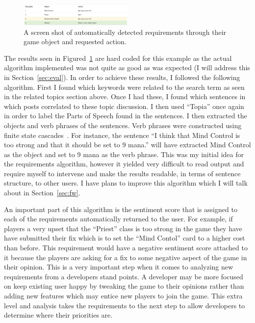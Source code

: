 \documentclass[conference]{IEEEtran}
\begin{document}
\begin{figure}[h]
\centering
\includegraphics[width=0.5\textwidth]{images/req.png}
\caption{A screen shot of automatically detected requirements through their game object and
requested action.\label{fig:req}}
\end{figure}

The results seen in Figured~\ref{fig:req} are hard coded for this example as the actual algorithm implemented
was not quite as good as was expected (I will address this in Section~\ref{sec:eval}). In order to achieve these
results, I followed the following algorithm. First I found which keywords were related to the search term as
seen in the related topics section above. Once I had these, I found which sentences in which posts correlated
to these topic discussion. I then used ``Topia'' once again in order to label the Parts of Speech found in
the sentences. I then extracted the objects and verb phrases of the sentences. 
Verb phrases were constructed using finite state cascades~\cite{Abney:1996:PSC}. For instance, the sentence 
``I think that Mind Control is too strong and that it should be set to 9 mana.'' will have extracted
Mind Control as the object and set to 9 mana as the verb phrase. This was my initial idea for the requirements
algorithm, however it yielded very difficult to read output and require myself to intervene and make the
results readable, in terms of sentence structure, to other users. I have plans to improve this algorithm
which I will talk about in Section~\ref{sec:fw}.

An important part of this algorithm is the sentiment score that is assigned to each of the requirements
automatically returned to the user. For example, if players a very upset that the ``Priest'' class is too
strong in the game they have have submitted their fix which is to set the ``Mind Contol'' card to a higher
cost than before. This requirement would have a negative sentiment score attached to it because the players
are asking for a fix to some negative aspect of the game in their opinion. This is a very important step
when it comes to analyzing new requirements from a developers stand points. A developer may be more focused
on keep existing user happy by tweaking the game to their opinions rather than adding new features which may
entice new players to join the game. This extra level and analysis takes the requirements to the next step
to allow developers to determine where their priorities are.
\end{document}
